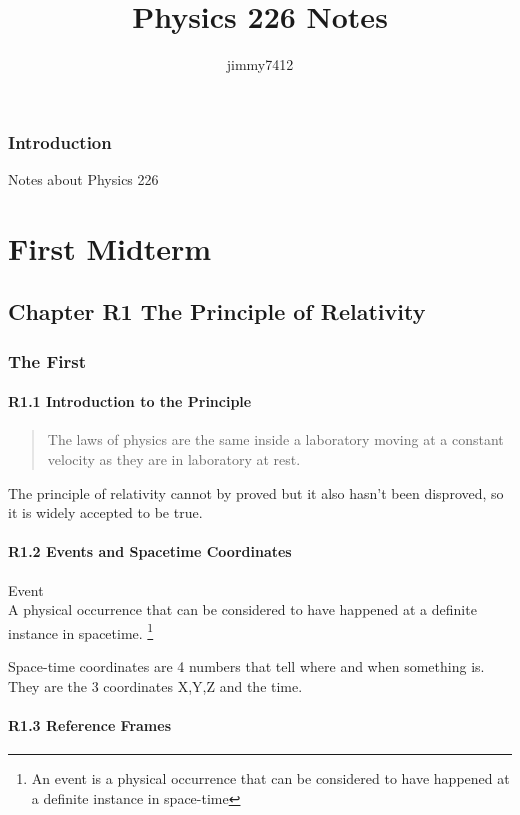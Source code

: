 \documentclass[twocolumn]{report}
\title{Physics 226 Notes}
\author{jimmy7412}
\begin{document}
\maketitle
\tableofcontents{}

\section*{Introduction}
Notes about Physics 226

\part{First Midterm}

\chapter{Chapter R1 The Principle of Relativity}

\section{The First}

\subsection{R1.1 Introduction to the Principle}

\begin{quote}
    The laws of physics are the same inside a laboratory moving at a constant velocity as they are in laboratory at rest.
\end{quote}

The principle of relativity cannot by proved but it also hasn't been disproved, so it is widely accepted to be true. 

\subsection{R1.2 Events and Spacetime Coordinates}

Event\\
A physical occurrence that can be considered to have happened at a definite instance in spacetime. \footnote{An event is a physical occurrence that can be considered to have happened at a definite instance in space-time}

Space-time coordinates are 4 numbers that tell where and when something is. They are the 3 coordinates X,Y,Z and the time. 

\subsection{R1.3 Reference Frames}
\end{document}
